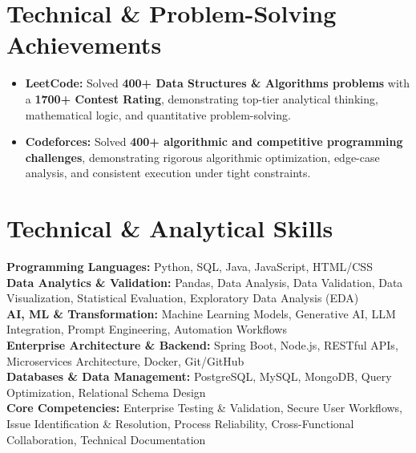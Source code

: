 \documentclass[letterpaper,10pt]{article}
\newcommand{\resumeItem}[1]{
  \item\small{
    {#1 \vspace{-2pt}}
  }
}
\newcommand{\resumeItemListStart}{\begin{itemize}[leftmargin=0.15in, label=$\bullet$]}
\newcommand{\resumeItemListEnd}{\end{itemize}\vspace{-4pt}}
\begin{document}
\section{Technical \& Problem-Solving Achievements}
  \resumeItemListStart
    \resumeItem{\textbf{LeetCode:} Solved \textbf{400+ Data Structures \& Algorithms problems} with a \textbf{1700+ Contest Rating}, demonstrating top-tier analytical thinking, mathematical logic, and quantitative problem-solving.}
    \resumeItem{\textbf{Codeforces:} Solved \textbf{400+ algorithmic and competitive programming challenges}, demonstrating rigorous algorithmic optimization, edge-case analysis, and consistent execution under tight constraints.}
  \resumeItemListEnd

\section{Technical \& Analytical Skills}
 \begin{itemize}[leftmargin=0.15in, label={}]
    \small{\item{
     \textbf{Programming Languages:}{ Python, SQL, Java, JavaScript, HTML/CSS} \\
     \textbf{Data Analytics \& Validation:}{ Pandas, Data Analysis, Data Validation, Data Visualization, Statistical Evaluation, Exploratory Data Analysis (EDA)} \\
     \textbf{AI, ML \& Transformation:}{ Machine Learning Models, Generative AI, LLM Integration, Prompt Engineering, Automation Workflows} \\
     \textbf{Enterprise Architecture \& Backend:}{ Spring Boot, Node.js, RESTful APIs, Microservices Architecture, Docker, Git/GitHub} \\
     \textbf{Databases \& Data Management:}{ PostgreSQL, MySQL, MongoDB, Query Optimization, Relational Schema Design} \\
     \textbf{Core Competencies:}{ Enterprise Testing \& Validation, Secure User Workflows, Issue Identification \& Resolution, Process Reliability, Cross-Functional Collaboration, Technical Documentation}
    }}
 \end{itemize}

\end{document}
